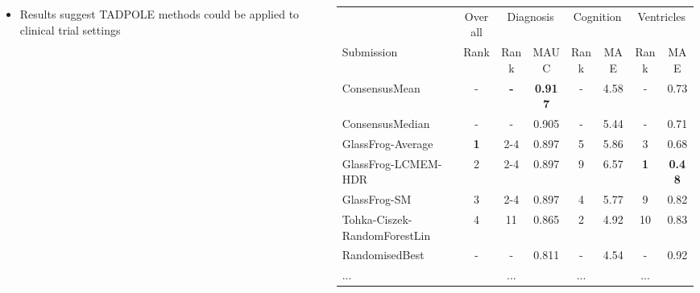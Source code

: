 \documentclass[8pt,xcolor=table,aspectratio=169]{beamer}
\begin{document}
\begin{frame}
\begin{columns}[t]
\begin{column}[t]{0.4\textwidth}
\begin{itemize}
 \item Results suggest TADPOLE methods could be applied to clinical trial settings
\end{itemize}
\end{column}
\begin{column}[t]{0.5\textwidth}
\vspace{-1.2em}
 \begin{table}
 \fontsize{6}{8}\selectfont
\begin{tabular}{lc|cc|cc|cc}
 \Xhline{2.5\arrayrulewidth}
  & Overall & \multicolumn{2}{c|}{Diagnosis} & \multicolumn{2}{c|}{Cognition}  & \multicolumn{2}{c}{Ventricles}\\
                       Submission & Rank &  Rank & MAUC & Rank & MAE & Rank & MAE \\
 \Xhline{2.5\arrayrulewidth}
ConsensusMean & - & \textbf{-} & \textbf{0.917} & - & 4.58 & - & 0.73\\ 
ConsensusMedian & - & - & 0.905 & - & 5.44 & - & 0.71\\ 
GlassFrog-Average & \textbf{1} & 2-4 & 0.897 & 5 & 5.86 & 3 & 0.68\\ 
GlassFrog-LCMEM-HDR & 2 & 2-4 & 0.897 & 9 & 6.57 & \textbf{1} & \textbf{0.48}\\ 
GlassFrog-SM & 3 & 2-4 & 0.897 & 4 & 5.77 & 9 & 0.82\\ 
Tohka-Ciszek-RandomForestLin & 4 & 11 & 0.865 & 2 & 4.92 & 10 & 0.83\\ 
RandomisedBest & - & - & 0.811 & - & 4.54 & - & 0.92\\ 
... &  & ... &  & ... &  & ... & \\ 

\end{tabular}
\end{table}
\end{column}
\end{columns}
\end{frame}
\end{document}
